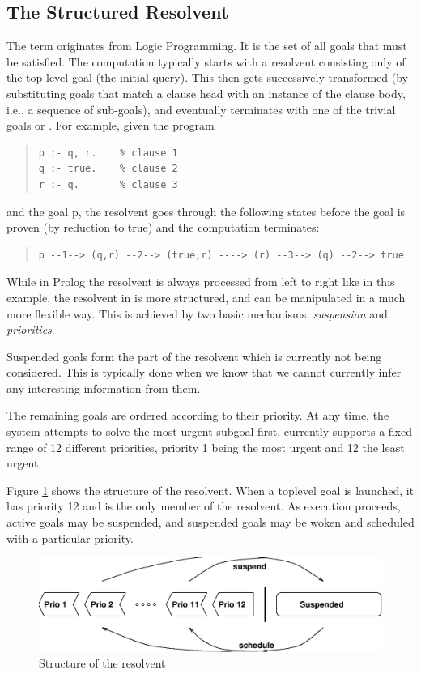 \subsection{The Structured Resolvent}
The term  originates from Logic Programming.
It is the set of all goals that must be satisfied.
The computation typically starts with a resolvent consisting only of the
top-level goal
(the initial query).
This then gets successively transformed (by substituting goals that
match a clause head with an instance of the clause body, i.e., a
sequence of sub-goals),
and eventually terminates with one of the trivial goals
 or .
For example, given the program
\begin{quote}
\begin{verbatim}
p :- q, r.    % clause 1
q :- true.    % clause 2
r :- q.       % clause 3
\end{verbatim}
\end{quote}
and the goal p, the resolvent goes through the following states
before the goal is proven (by reduction to true) and the computation terminates:
\begin{quote}
\begin{verbatim}
p --1--> (q,r) --2--> (true,r) ----> (r) --3--> (q) --2--> true
\end{verbatim}
\end{quote}

While in Prolog the resolvent is always processed from left to right
like in this example,
the resolvent in {\eclipse} is more structured, and can be manipulated
in a much more flexible way.
This is achieved by two basic mechanisms, \emph{suspension}
and \emph{priorities}.

Suspended goals form the part of the resolvent which is
currently not being considered. This is typically done when we
know that we cannot currently infer any interesting information from them.

The remaining goals are ordered according to their priority.
At any time, the system attempts to solve the most urgent subgoal first.
{\eclipse} currently supports a fixed range of 12 different priorities,
priority 1 being the most urgent and 12 the least urgent.

Figure \ref{figresolv} shows the structure of the resolvent.
When a toplevel goal is launched, it has priority 12 and is the only
member of the resolvent. As execution proceeds, active goals may be
suspended, and suspended goals may be woken and scheduled with a
particular priority.
\begin{figure}
\includegraphics{resolv.eps}
\caption{Structure of the resolvent}
\label{figresolv}
\end{figure}

